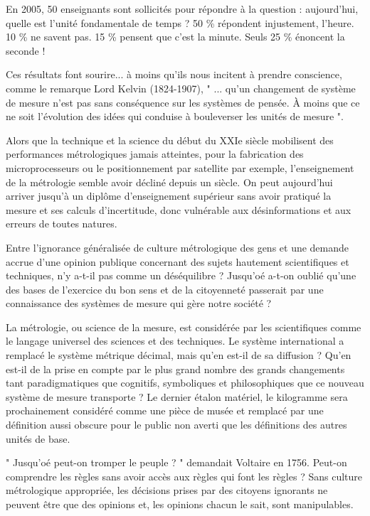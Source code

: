 En 2005, 50 enseignants sont sollicités pour répondre à la question : aujourd'hui, quelle est l'unité fondamentale de temps ?   50 \% répondent injustement, l'heure.  10 \% ne savent pas.  15 \% pensent que c'est la minute.  Seuls 25 \% énoncent la seconde !

Ces résultats font sourire... à moins qu'ils nous incitent à prendre conscience, comme le remarque Lord Kelvin (1824-1907), " ... qu'un changement de système de mesure n'est pas sans conséquence sur les systèmes de pensée.  À moins que ce ne soit l'évolution des idées qui conduise à bouleverser les unités de mesure ".

Alors que la technique et la science du début du XXIe siècle mobilisent des performances métrologiques jamais atteintes, pour la fabrication des microprocesseurs ou le positionnement par satellite par exemple, l'enseignement de la métrologie semble avoir décliné depuis un siècle. On peut aujourd'hui arriver jusqu'à un diplôme d'enseignement supérieur sans avoir pratiqué la mesure et ses calculs d'incertitude, donc vulnérable aux désinformations et aux erreurs de toutes natures.

Entre l'ignorance généralisée de culture métrologique des gens et une demande accrue d'une  opinion publique concernant des sujets hautement scientifiques et techniques, n'y a-t-il pas comme un déséquilibre ?  Jusqu'oé a-t-on oublié qu'une des bases de l'exercice du bon sens et de la citoyenneté passerait par une connaissance des systèmes de mesure qui gère notre société ?

La métrologie, ou science de la mesure, est considérée par les scientifiques comme le langage universel des sciences et des techniques.  Le système international a remplacé le système métrique décimal, mais qu'en est-il de sa diffusion ?  Qu'en est-il de la prise en compte par le plus grand nombre des grands changements tant paradigmatiques que cognitifs, symboliques et philosophiques que ce nouveau système de mesure transporte ?  Le dernier étalon matériel, le kilogramme sera prochainement considéré comme une pièce de musée et remplacé par une définition aussi obscure pour le public non averti que les définitions des autres unités de base.

" Jusqu'oé peut-on tromper le peuple ? " demandait Voltaire en 1756.  Peut-on comprendre les règles sans avoir accès aux règles qui font les règles ?  Sans culture métrologique appropriée, les décisions prises par des citoyens ignorants ne peuvent être que des opinions et, les opinions chacun le sait, sont manipulables.

